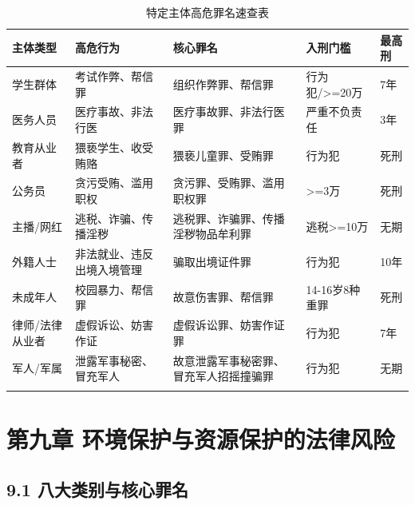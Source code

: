 \documentclass[12pt,a4paper]{article}
\begin{document}
\begin{longtable}{p{2cm}p{3cm}p{3cm}p{3cm}p{2cm}}
  \toprule
  \textbf{主体类型} & \textbf{高危行为} & \textbf{核心罪名} & \textbf{入刑门槛} & \textbf{最高刑} \\
  \midrule
  学生群体 & 考试作弊、帮信罪 & 组织作弊罪、帮信罪 & 行为犯/>=20万 & 7年 \\
  医务人员 & 医疗事故、非法行医 & 医疗事故罪、非法行医罪 & 严重不负责任 & 3年 \\
  教育从业者 & 猥亵学生、收受贿赂 & 猥亵儿童罪、受贿罪 & 行为犯 & 死刑 \\
  公务员 & 贪污受贿、滥用职权 & 贪污罪、受贿罪、滥用职权罪 & >=3万 & 死刑 \\
  主播/网红 & 逃税、诈骗、传播淫秽 & 逃税罪、诈骗罪、传播淫秽物品牟利罪 & 逃税>=10万 & 无期 \\
  外籍人士 & 非法就业、违反出境入境管理 & 骗取出境证件罪 & 行为犯 & 10年 \\
  未成年人 & 校园暴力、帮信罪 & 故意伤害罪、帮信罪 & 14-16岁8种重罪 & 死刑 \\
  律师/法律从业者 & 虚假诉讼、妨害作证 & 虚假诉讼罪、妨害作证罪 & 行为犯 & 7年 \\
  军人/军属 & 泄露军事秘密、冒充军人 & 故意泄露军事秘密罪、冒充军人招摇撞骗罪 & 行为犯 & 无期 \\
  \bottomrule
  \caption{特定主体高危罪名速查表}
\end{longtable}

\clearpage

\section{第九章 环境保护与资源保护的法律风险}

\subsection{9.1 八大类别与核心罪名}
\end{document}
